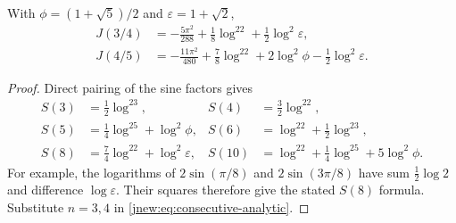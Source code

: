 \begin{corollary}\label{jnew:cor:small-evenodd}
With $\phi=(1+\sqrt5)/2$ and $\varepsilon=1+\sqrt2$,
\begin{align}
 J(3/4)&=-\frac{5\pi^2}{288}+\frac18\log^22
                         +\frac12\log^2\varepsilon,
 \label{jnew:eq:J34}\\
 J(4/5)&=-\frac{11\pi^2}{480}+\frac78\log^22
             +2\log^2\phi-\frac12\log^2\varepsilon.
 \label{jnew:eq:J45}
\end{align}
\end{corollary}
\begin{proof}
Direct pairing of the sine factors gives
\begin{align*}
 S(3)&=\tfrac12\log^23,& S(4)&=\tfrac32\log^22,\\
 S(5)&=\tfrac14\log^25+\log^2\phi,
 &S(6)&=\log^22+\tfrac12\log^23,\\
 S(8)&=\tfrac74\log^22+\log^2\varepsilon,
 &S(10)&=\log^22+\tfrac14\log^25+5\log^2\phi.
\end{align*}
For example, the logarithms of $2\sin(\pi/8)$ and
$2\sin(3\pi/8)$ have sum $\tfrac12\log2$ and difference
$\log\varepsilon$. Their squares therefore give the stated $S(8)$
formula. Substitute $n=3,4$ in
\eqref{jnew:eq:consecutive-analytic}.
\end{proof}

